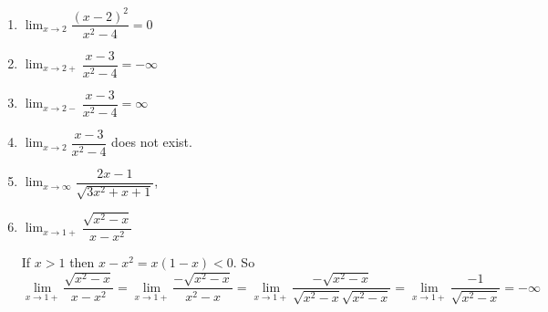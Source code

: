 \documentclass[../main.tex]{subfiles}
\begin{document}
  \begin{example}
    \begin{enumerate}
      \item $\lim_{x \to 2} \dfrac{(x-2)^2}{x^2-4} = 0$
      \item $\lim_{x \to 2+} \dfrac{x-3}{x^2-4} = -\infty$
      \item $\lim_{x \to 2-} \dfrac{x-3}{x^2-4} = \infty$
      \item $\lim_{x \to 2} \dfrac{x-3}{x^2-4}$ does not exist.
      \item $\lim_{x \to \infty} \dfrac{2x-1}{\sqrt{3x^2+x+1}}$,
      \item $\lim_{x \to 1+} \dfrac{\sqrt{x^2-x}}{x-x^2}$
      \begin{solution}
        If $x>1$ then $x-x^2 = x(1-x) < 0$. So
        \[
          \lim_{x \to 1+} \dfrac{\sqrt{x^2-x}}{x-x^2} =
          \lim_{x \to 1+} \dfrac{-\sqrt{x^2-x}}{x^2-x} =
          \lim_{x \to 1+} \dfrac{-\sqrt{x^2-x}}{\sqrt{x^2-x} \sqrt{x^2-x}} =
          \lim_{x \to 1+} \dfrac{-1}{\sqrt{x^2-x}} = -\infty
        \]
      \end{solution}
    \end{enumerate}
  \end{example}
\end{document}
